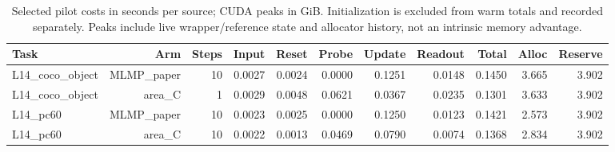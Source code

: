 \begin{table}[htbp]
\centering\scriptsize
\caption{Selected pilot costs in seconds per source; CUDA peaks in GiB. Initialization is excluded from warm totals and recorded separately. Peaks include live wrapper/reference state and allocator history, not an intrinsic memory advantage.}
\label{tab:cost}
\setlength{\tabcolsep}{4pt}
\begin{tabular}{lrrrrrrrrrr}
\toprule
Task & Arm & Steps & Input & Reset & Probe & Update & Readout & Total & Alloc & Reserve \\
\midrule
L14\_coco\_object & MLMP\_paper & 10 & 0.0027 & 0.0024 & 0.0000 & 0.1251 & 0.0148 & 0.1450 & 3.665 & 3.902 \\
L14\_coco\_object & area\_C & 1 & 0.0029 & 0.0048 & 0.0621 & 0.0367 & 0.0235 & 0.1301 & 3.633 & 3.902 \\
L14\_pc60 & MLMP\_paper & 10 & 0.0023 & 0.0025 & 0.0000 & 0.1250 & 0.0123 & 0.1421 & 2.573 & 3.902 \\
L14\_pc60 & area\_C & 10 & 0.0022 & 0.0013 & 0.0469 & 0.0790 & 0.0074 & 0.1368 & 2.834 & 3.902 \\
\bottomrule
\end{tabular}
\end{table}
